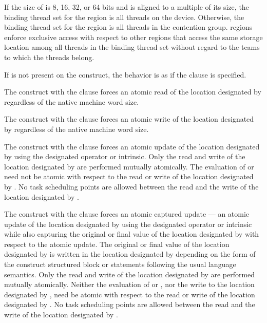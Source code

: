 

\begin{samepage}

\binding
If the size of  is 8, 16, 32, or 64 bits and  is aligned to a
multiple of its size, the binding thread set for the  region is
all threads on the device. Otherwise, the binding thread set for the
 region is all threads in the contention group.  
regions enforce exclusive access with respect to other  regions
that access the same storage location  among all threads in the
binding thread set without regard to the teams to which the threads belong.

\descr

If  is not present on the construct, the behavior is as if
the  clause is specified.

The  construct with the  clause forces an
atomic read of the location 
designated by  regardless of the native machine word size.
\end{samepage}

The  construct with the  clause forces an
atomic write of the location 
designated by  regardless of the native machine word size.

The  construct with the  clause forces an
atomic update of the location designated by  using the
designated operator or intrinsic.  Only the read and write of the
location designated by  are performed mutually atomically. The
evaluation of  or  need not be atomic with respect to
the read or write of the location designated by . No task scheduling
points are allowed between the read and the write of the location designated
by . 

The  construct with the  clause forces an
atomic captured update --- an atomic update of the
location designated by  using the designated operator or intrinsic
while also capturing the original or final value of the location designated by
 with respect to the atomic update. The original or final value of the
location designated by  is written in the location designated by
 depending on the form of the  construct structured block
or statements following the usual language semantics. Only the read and write
of the location designated by  are performed mutually atomically.
Neither the evaluation of  or , nor the write to the
location designated by , need be atomic with respect to the read or
write of the location designated by . No task scheduling points are
allowed between the read and the write of the location designated by .

